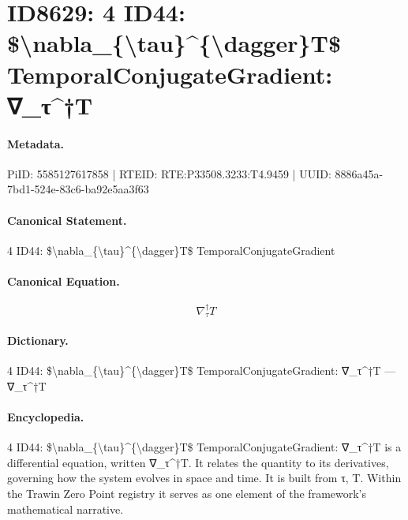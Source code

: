 \section*{ID8629: 4 ID44: \$\textbackslash{}nabla\_\{\textbackslash{}tau\}\textasciicircum{}\{\textbackslash{}dagger\}T\$ TemporalConjugateGradient: ∇\_τ\textasciicircum{}†T}
\paragraph{Metadata.}
PiID: 5585127617858 | RTEID: RTE:P33508.3233:T4.9459 | UUID: 8886a45a-7bd1-524e-83c6-ba92e5aa3f63

\paragraph{Canonical Statement.}
4 ID44: \$\textbackslash{}nabla\_\{\textbackslash{}tau\}\textasciicircum{}\{\textbackslash{}dagger\}T\$ TemporalConjugateGradient

\paragraph{Canonical Equation.}
\[
\nabla_{\tau}^{\dagger}T
\]

\paragraph{Dictionary.}
4 ID44: \$\textbackslash{}nabla\_\{\textbackslash{}tau\}\textasciicircum{}\{\textbackslash{}dagger\}T\$ TemporalConjugateGradient: ∇\_τ\textasciicircum{}†T — ∇\_τ\textasciicircum{}†T

\paragraph{Encyclopedia.}
4 ID44: \$\textbackslash{}nabla\_\{\textbackslash{}tau\}\textasciicircum{}\{\textbackslash{}dagger\}T\$ TemporalConjugateGradient: ∇\_τ\textasciicircum{}†T is a differential equation, written ∇\_τ\textasciicircum{}†T. It relates the quantity to its derivatives, governing how the system evolves in space and time. It is built from τ, T. Within the Trawin Zero Point registry it serves as one element of the framework's mathematical narrative.
